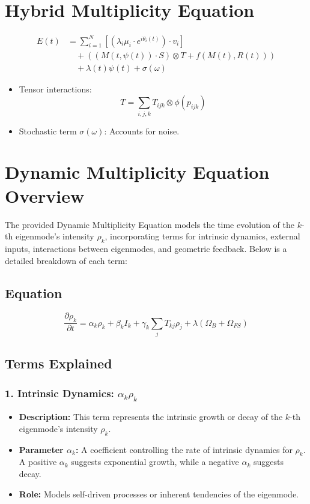 \documentclass{article}
\theoremstyle{plain}
\begin{document}
\begin{itemize}
\section{Hybrid Multiplicity Equation}
\begin{align}
E(t) &= \sum_{i=1}^N \left[ \left( \lambda_i \mu_i \cdot e^{i\theta_i(t)} \right) \cdot v_i \right] \nonumber \\
&\quad + \left( (M(t, \psi(t)) \cdot S) \otimes T + f(M(t), R(t)) \right) \nonumber \\
&\quad + \lambda(t)\psi(t) + \sigma(\omega)
\end{align}
\begin{itemize}
    \item Tensor interactions:
    \[
    T = \sum_{i,j,k} T_{ijk} \otimes \phi(p_{ijk})
    \]
    \item Stochastic term \( \sigma(\omega) \): Accounts for noise.
\end{itemize}

\section{Dynamic Multiplicity Equation Overview}

The provided Dynamic Multiplicity Equation models the time evolution of the \(k\)-th eigenmode’s intensity \(\rho_k\), incorporating terms for intrinsic dynamics, external inputs, interactions between eigenmodes, and geometric feedback. Below is a detailed breakdown of each term:

\subsection{Equation}
\begin{equation}
\frac{\partial \rho_k}{\partial t} = \alpha_k \rho_k + \beta_k I_k + \gamma_k \sum_j T_{kj} \rho_j + \lambda (\Omega_B + \Omega_{FS})
\end{equation}

\subsection{Terms Explained}

\subsubsection{1. Intrinsic Dynamics: \(\alpha_k \rho_k\)}
\begin{itemize}
    \item \textbf{Description:} This term represents the intrinsic growth or decay of the \(k\)-th eigenmode’s intensity \(\rho_k\).
    \item \textbf{Parameter \(\alpha_k\):} A coefficient controlling the rate of intrinsic dynamics for \(\rho_k\). A positive \(\alpha_k\) suggests exponential growth, while a negative \(\alpha_k\) suggests decay.
    \item \textbf{Role:} Models self-driven processes or inherent tendencies of the eigenmode.
\end{itemize}


\end{itemize}
\end{document}
